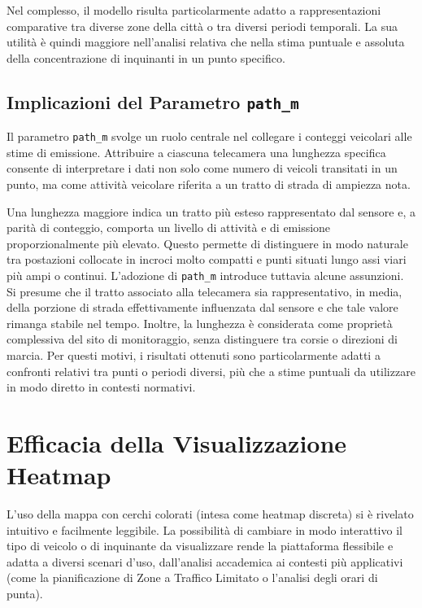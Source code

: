 \documentclass[12pt, oneside]{extbook}
\begin{document}
Nel complesso, il modello risulta particolarmente adatto a rappresentazioni
comparative tra diverse zone della città o tra diversi periodi temporali. La sua utilità è quindi maggiore nell'analisi relativa che nella stima puntuale e assoluta della concentrazione di inquinanti in un punto specifico.

\subsection{Implicazioni del Parametro \texttt{path\_m}}

Il parametro \texttt{path\_m} svolge un ruolo centrale nel collegare i
conteggi veicolari alle stime di emissione. Attribuire a ciascuna
telecamera una lunghezza specifica consente di interpretare i dati non
solo come numero di veicoli transitati in un punto, ma come attività
veicolare riferita a un tratto di strada di ampiezza nota.

Una lunghezza maggiore indica un tratto più esteso rappresentato dal sensore e, a parità di conteggio, comporta un livello di attività e di emissione proporzionalmente più elevato. Questo permette di distinguere in modo naturale tra postazioni collocate in incroci molto compatti e punti situati lungo assi viari più ampi o continui.
L’adozione di \texttt{path\_m} introduce tuttavia alcune assunzioni. Si
presume che il tratto associato alla telecamera sia rappresentativo, in media, della porzione di strada effettivamente influenzata dal sensore e che tale valore rimanga stabile nel tempo. Inoltre, la lunghezza è considerata come proprietà complessiva del sito di monitoraggio, senza distinguere tra corsie o direzioni di marcia. Per questi motivi, i risultati ottenuti sono particolarmente adatti a confronti relativi tra punti o periodi diversi, più che a stime puntuali da utilizzare in modo diretto in contesti normativi.

\section{Efficacia della Visualizzazione Heatmap}

L'uso della mappa con cerchi colorati (intesa come heatmap discreta) si è rivelato intuitivo e facilmente leggibile. La possibilità di cambiare in modo interattivo il tipo di veicolo o di inquinante da visualizzare rende la piattaforma flessibile e adatta a diversi scenari d'uso, dall'analisi accademica ai contesti più applicativi (come la pianificazione di Zone a Traffico Limitato o l'analisi degli orari di punta).
\end{document}
